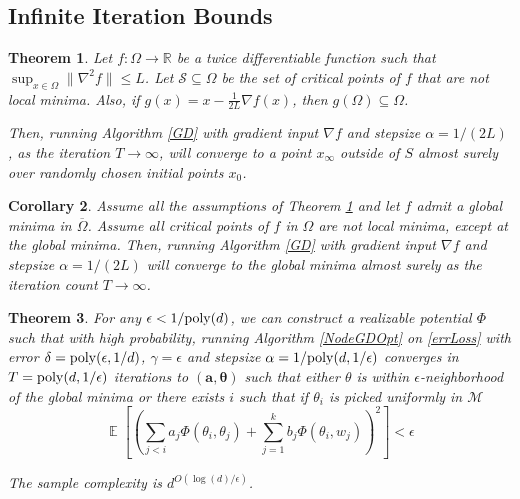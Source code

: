 \documentclass[11pt]{article}
\newtheorem{theorem}{Theorem}[section]
\newtheorem{corollary}[theorem]{Corollary}
\newcommand{\R}{{\mathbb{R}}}
\DeclareMathOperator*{\expt}{\mathbb{E}}
\begin{document}

\subsection{Infinite Iteration Bounds} 
\label{InfIter}


\begin{theorem}\cite{lee2016gradient, PanageasP16}\label{convStrict}
  Let $f :\Omega \to \R$ be a twice differentiable function such that
  $\sup_{x \in \Omega} \|\nabla^2 f\| \leq L$. Let
  $\mathcal{S} \subseteq \Omega$ be the set of critical points of $f$
  that are not local minima. Also, if
  $g(x) = x - \frac{1}{2L} \nabla f(x)$, then
  $g(\Omega) \subseteq \Omega$.

  Then, running Algorithm \ref{GD} with gradient input $\nabla f$ and
  stepsize $\alpha = 1/(2L)$, as the iteration $T \to\infty$, will
  converge to a point $x_\infty$ outside of $S$ almost surely over
  randomly chosen initial points $x_0$.
\end{theorem}

\begin{corollary}
Assume all the assumptions of Theorem \ref{convStrict} and let $f$ admit a global minima in $\overline{\Omega}$. Assume all critical points of $f$ in $\Omega$ are not local minima, except at the global minima. Then, running Algorithm \ref{GD} with gradient input $\nabla f$ and stepsize $\alpha = 1/(2L)$ will converge to the global minima almost surely as the iteration count $T \to\infty$.
\end{corollary}
\fi


\begin{theorem}
For any $\epsilon < 1/\mathrm{poly}(d)$, we can construct a realizable potential $\Phi$ such that with high probability, running Algorithm \ref{NodeGDOpt} on \eqref{errLoss} with error $\delta = \mathrm{poly}(\epsilon,1/d)$, $\gamma = \epsilon$ and stepsize $\alpha = 1/\mathrm{poly}(d,1/\epsilon)$ converges in $T = \mathrm{poly}(d, 1/\epsilon)$ iterations to $(\boldsymbol{a,\theta})$ such that either  $\theta$ is within $\epsilon$-neighborhood of the global minima or there exists $i$ such that if $\theta_i$ is picked uniformly in $\mathcal{M}$
%
\[ \expt\left[\left( \sum_{j < i} a_j \Phi(\theta_i,\theta_j) + \sum_{j=1}^k b_j \Phi(\theta_i,w_j)\right)^2\right] < \epsilon\]

The sample complexity is $d^{O(\log(d)/\epsilon)}$.
\end{theorem}
\end{document}
